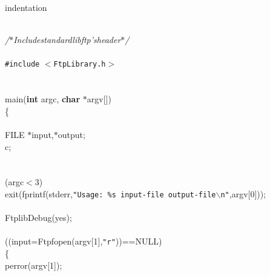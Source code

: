 \expandafter\ifx\csname indentation\endcsname\relax
\newlength{\indentation}\fi
\setlength{\indentation}{0.5em}
\begin{flushleft}
\mbox{}\\
{\em /$\ast$\hspace*{1\indentation}Include\hspace*{1\indentation}standard\hspace*{1\indentation}libftp's\hspace*{1\indentation}header\hspace*{1\indentation}$\ast$/}\mbox{}\\
\mbox{}\\
{\tt\#include} $<${\tt FtpLibrary.h}$>$ \mbox{}\\
\mbox{}\\
\mbox{}\\
main({\bf int\/} argc, {\bf char\/} $\ast$argv[])\mbox{}\\
\{\mbox{}\\
\mbox{}\\
\hspace*{2\indentation}FILE $\ast$input,$\ast$output;\mbox{}\\
\hspace*{2\indentation}{\bf int\/} c;\mbox{}\\
\hspace*{2\indentation}\mbox{}\\
\mbox{}\\
\hspace*{2\indentation}{\bf if\/} (argc$<$3)\mbox{}\\
\hspace*{4\indentation}exit(fprintf(stderr,{\tt "Usage: \%s input-file output-file$\backslash$n"},argv[0]));\mbox{}\\
\mbox{}\\
\hspace*{2\indentation}FtplibDebug(yes);\mbox{}\\
\hspace*{2\indentation}\mbox{}\\
\hspace*{2\indentation}{\bf if\/} ((input=Ftpfopen(argv[1],{\tt "r"}))==NULL)\mbox{}\\
\hspace*{4\indentation}\{\mbox{}\\
\hspace*{6\indentation}perror(argv[1]);\mbox{}\\

\end{flushleft}
